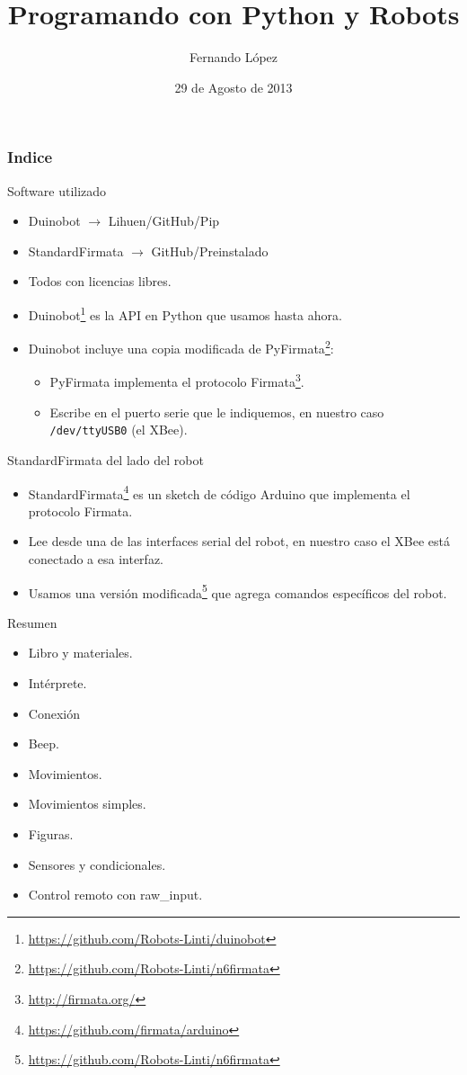 \documentclass{beamer}[10]
\title{Programando con Python y Robots}
\author{Fernando López}
\institute{LINTI \\ Facultad de Informática \\ Universidad Nacional de la Plata
}
\date{29 de Agosto de 2013}
\begin{document}
\frame{\titlepage \vspace{-0.5cm}

}


\frame
{
\frametitle{Indice}
\tableofcontents[pausesection]
}


\begin{frame}{Software utilizado}
	\begin{itemize}[<+->]
		\item Duinobot $\rightarrow$ Lihuen/GitHub/Pip
		\item StandardFirmata $\rightarrow$ GitHub/Preinstalado
		\item Todos con licencias libres.
	\end{itemize}
	\begin{itemize}[<+->]
		\item Duinobot\footnote{\url{https://github.com/Robots-Linti/duinobot}} es la API en Python que usamos hasta ahora.
		\item Duinobot incluye una copia modificada de PyFirmata\footnote{\url{https://github.com/Robots-Linti/n6firmata}}:
		\begin{itemize}
			\item PyFirmata implementa el protocolo Firmata\footnote{\url{http://firmata.org/}}.
			\item Escribe en el puerto serie que le indiquemos, en nuestro caso \texttt{/dev/ttyUSB0} (el XBee).
			\
		\end{itemize}
	\end{itemize}
\end{frame}
\begin{frame}{StandardFirmata del lado del robot}
	\begin{itemize}[<+->]
		\item StandardFirmata\footnote{\url{https://github.com/firmata/arduino}} es un sketch de código Arduino que implementa el protocolo Firmata.
		\item Lee desde una de las interfaces serial del robot, en nuestro caso el XBee está conectado a esa interfaz.
		\item Usamos una versión modificada\footnote{\url{https://github.com/Robots-Linti/n6firmata}} que agrega comandos específicos del robot.
	\end{itemize}
\end{frame}
\begin{frame}{Resumen}
	\begin{itemize}[<+->]
		\item Libro y materiales.
		\item Intérprete.
		\item Conexión
		\item Beep.
		\item Movimientos.
		\item Movimientos simples.
		\item Figuras.
		\item Sensores y condicionales.
		\item Control remoto con raw\_input.
	\end{itemize}
\end{frame}
\end{document}
